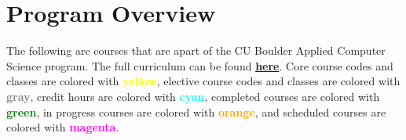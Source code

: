 \horizontalline{-2em}{-4em}

\section*{Program Overview}

The following are courses that are apart of the CU Boulder Applied Computer Science program. The full curriculum can be found \href{https://www.colorado.edu/program/cspb/academics/curriculum-course-list}{\textbf{here}}. 
Core course codes and classes are colored with \textcolor{yellow}{\textbf{yellow}}, elective course codes and classes are colored with \textcolor{gray}{\textbf{gray}}, credit hours are colored with \textcolor{cyan}{\textbf{cyan}}, 
completed courses are colored with \textcolor{green}{\textbf{green}}, in progress courses are colored with \textcolor{orange}{\textbf{orange}}, and scheduled courses are colored with \textcolor{magenta}{\textbf{magenta}}.

